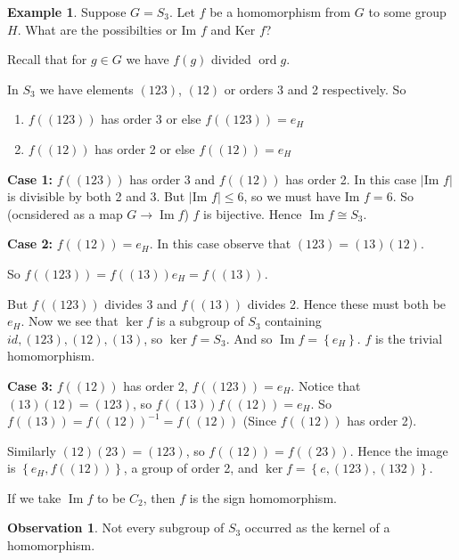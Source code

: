 \documentclass{article}
\theoremstyle{definition}
\newtheorem*{exmp}{Example}
\newtheorem*{obvs}{Observation}
\DeclareMathOperator{\Ima}{Im}
\DeclareMathOperator{\ord}{\text{ord}}
\begin{document}
\begin{exmp}
  Suppose $G=S_3$. Let $f$ be a homomorphism from $G$ to some group $H$. What are the possibilties or $\text{Im }f$ and $\text{Ker }f$?

  Recall that for $g \in G$ we have $f(g)$ divided $\ord g$.

  In $S_3$ we have elements $(123)$, $(12)$ or orders 3 and 2 respectively. So
  \begin{enumerate}
    \item 
  $f\left( (123) \right)$ has order 3 or else $f\left( (123) \right)=e_H$ 
    \item 
  $f\left( (12) \right)$ has order 2 or else $f\left( (12) \right)=e_H$ 
  \end{enumerate}

  \textbf{Case 1:} $f\left( (123) \right)$ has order 3 and $f\left(  (12)\right)$ has order 2. In this case $|\text{Im }f|$ is divisible by both 2 and 3. But $|\text{Im }f| \leq 6$, so we must have $\text{Im } f=6$. So (ocnsidered as a map $G \rightarrow \Ima f$) $f$ is bijective. Hence $\Ima f \cong S_3$.

  \textbf{Case 2:} $f\left( (12) \right)=e_H$. In this case observe that $(123)=(13)(12)$.

  So $f\left( (123) \right)=f\left( (13) \right)e_H=f\left( (13) \right)$.

  But $f\left( (123) \right)$ divides 3 and $f\left( (13) \right)$ divides 2. Hence these must both be $e_H$. Now we see that $\ker f$ is a subgroup of $S_3$ containing $id, (123), (12), (13)$, so $\ker f=S_3$. And so $\Ima f = \left\{ e_H \right\}$. $f$ is the trivial homomorphism.

  \textbf{Case 3:} $f\left( (12) \right)$ has order 2, $f\left( (123) \right)=e_H$. Notice that $(13)(12)=(123)$, so $f\left( (13) \right)f\left( (12) \right)=e_H$. So $f\left( (13) \right)=f\left( (12) \right)^{-1}=f\left( (12) \right)$ (Since $f\left( (12) \right)$ has order 2).

  Similarly $(12)(23)=(123)$, so $f\left( (12) \right)=f\left( (23) \right)$. Hence the image is $\left\{ e_H,f\left( (12) \right) \right\}$, a group of order 2, and $\ker f=\left\{ e,(123),(132) \right\}$.

  If we take $\Ima f$ to be $C_2$, then $f$ is the sign homomorphism.\\
\begin{obvs}
  
  Not every subgroup of $S_3$ occurred as the kernel of a homomorphism.
\end{obvs}
\end{exmp}
\end{document}
